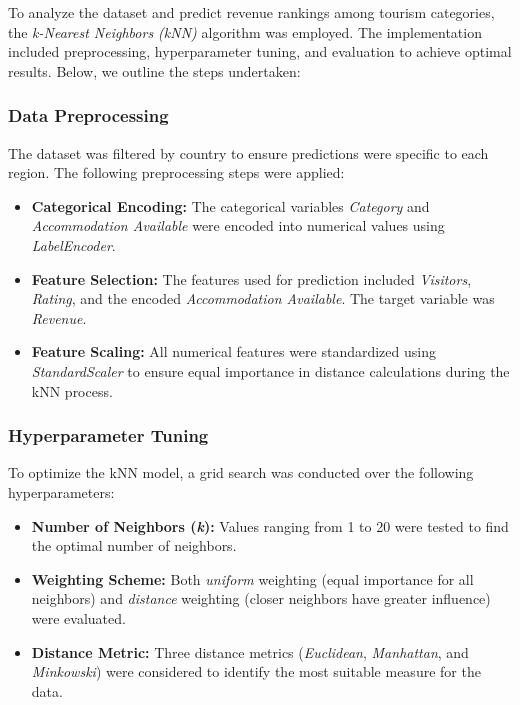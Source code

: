 \documentclass{article}
\begin{document}
To analyze the dataset and predict revenue rankings among tourism categories, the \textit{k-Nearest Neighbors (kNN)} algorithm was employed. The implementation included preprocessing, hyperparameter tuning, and evaluation to achieve optimal results. Below, we outline the steps undertaken:

\subsubsection{Data Preprocessing}

The dataset was filtered by country to ensure predictions were specific to each region. The following preprocessing steps were applied:
\begin{itemize}
    \item \textbf{Categorical Encoding:} The categorical variables \textit{Category} and \textit{Accommodation Available} were encoded into numerical values using \textit{LabelEncoder}.
    \item \textbf{Feature Selection:} The features used for prediction included \textit{Visitors}, \textit{Rating}, and the encoded \textit{Accommodation Available}. The target variable was \textit{Revenue}.
    \item \textbf{Feature Scaling:} All numerical features were standardized using \textit{StandardScaler} to ensure equal importance in distance calculations during the kNN process.
\end{itemize}

\subsubsection{Hyperparameter Tuning}

To optimize the kNN model, a grid search was conducted over the following hyperparameters:
\begin{itemize}
    \item \textbf{Number of Neighbors (\textit{k}):} Values ranging from 1 to 20 were tested to find the optimal number of neighbors.
    \item \textbf{Weighting Scheme:} Both \textit{uniform} weighting (equal importance for all neighbors) and \textit{distance} weighting (closer neighbors have greater influence) were evaluated.
    \item \textbf{Distance Metric:} Three distance metrics (\textit{Euclidean}, \textit{Manhattan}, and \textit{Minkowski}) were considered to identify the most suitable measure for the data.
\end{itemize}
\end{document}
